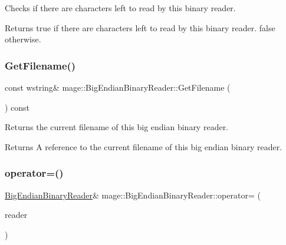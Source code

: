Checks if there are characters left to read by this binary reader.

\begin{DoxyReturn}{Returns}
{\ttfamily true} if there are characters left to read by this binary reader. {\ttfamily false} otherwise. 
\end{DoxyReturn}
\mbox{\label{classmage_1_1_big_endian_binary_reader_a801558f27606dbc681809178aaaaacd1}} 
\subsubsection{\texorpdfstring{Get\+Filename()}{GetFilename()}}
{\footnotesize\ttfamily const wstring\& mage\+::\+Big\+Endian\+Binary\+Reader\+::\+Get\+Filename (\begin{DoxyParamCaption}{ }\end{DoxyParamCaption}) const\hspace{0.3cm}{\ttfamily [noexcept]}}

Returns the current filename of this big endian binary reader.

\begin{DoxyReturn}{Returns}
A reference to the current filename of this big endian binary reader. 
\end{DoxyReturn}
\mbox{\label{classmage_1_1_big_endian_binary_reader_abd4b24df4219469a8c2e9253b1cad405}} 
\subsubsection{\texorpdfstring{operator=()}{operator=()}\hspace{0.1cm}{\footnotesize\ttfamily [1/2]}}
{\footnotesize\ttfamily \mbox{\hyperlink{classmage_1_1_big_endian_binary_reader}{Big\+Endian\+Binary\+Reader}}\& mage\+::\+Big\+Endian\+Binary\+Reader\+::operator= (\begin{DoxyParamCaption}\item[{const \mbox{\hyperlink{classmage_1_1_big_endian_binary_reader}{Big\+Endian\+Binary\+Reader}} \&}]{reader }\end{DoxyParamCaption})\hspace{0.3cm}{\ttfamily [delete]}}

